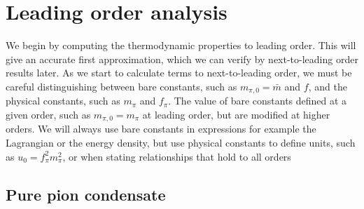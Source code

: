 \section{Leading order analysis}
\label{section: thermodynamics leading order}

We begin by computing the thermodynamic properties to leading order.
This will give an accurate first approximation, which we can verify by next-to-leading order results later.
As we start to calculate terms to next-to-leading order, we must be careful distinguishing between bare constants, such as $m_{\pi,0} = \bar m$ and $f$, and the physical constants, such as $m_\pi$ and $f_\pi$.
The value of bare constants defined at a given order, such as $m_{\pi,0} = m_\pi$ at leading order, but are modified at higher orders.
We will always use bare constants in expressions for example the Lagrangian or the energy density, but use physical constants to define units, such as $u_0 = f_\pi^2 m_\pi^2$, or when stating relationships that hold to all orders



\subsection{Pure pion condensate}
\label{subsection: pure pion condensate}


